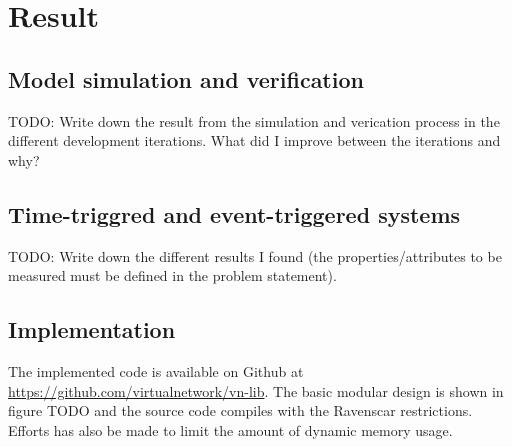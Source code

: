 \chapter{Result}\label{ch:result}
\section{Model simulation and verification}
TODO: Write down the result from the simulation and verication process in the
different development iterations. What did I improve between the iterations and
why?

\section{Time-triggred and event-triggered systems}
TODO: Write down the different results I found (the properties/attributes to be
measured must be defined in the problem statement).

\section{Implementation}
The implemented code is available on Github at
\url{https://github.com/virtualnetwork/vn-lib}. The basic modular design is
shown in figure TODO and the source code compiles with the Ravenscar
restrictions. Efforts has also be made to limit the amount of dynamic memory
usage.
